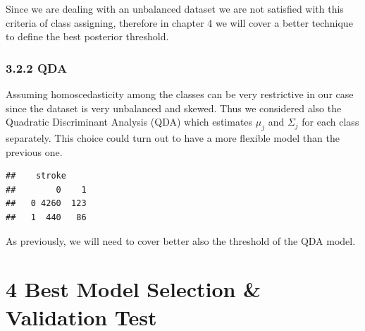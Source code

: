 \documentclass[
]{article}
\newenvironment{Shaded}{\begin{snugshade}}{\end{snugshade}}
\newcommand{\AttributeTok}[1]{\textcolor[rgb]{0.77,0.63,0.00}{#1}}
\newcommand{\DecValTok}[1]{\textcolor[rgb]{0.00,0.00,0.81}{#1}}
\newcommand{\FunctionTok}[1]{\textcolor[rgb]{0.00,0.00,0.00}{#1}}
\newcommand{\NormalTok}[1]{#1}
\newcommand{\OtherTok}[1]{\textcolor[rgb]{0.56,0.35,0.01}{#1}}
\newcommand{\SpecialCharTok}[1]{\textcolor[rgb]{0.00,0.00,0.00}{#1}}
\begin{document}
Since we are dealing with an unbalanced dataset we are not satisfied
with this criteria of class assigning, therefore in chapter 4 we will
cover a better technique to define the best posterior threshold.

\hypertarget{qda}{%
\subsubsection{3.2.2 QDA}\label{qda}}

Assuming homoscedasticity among the classes can be very restrictive in
our case since the dataset is very unbalanced and skewed. Thus we
considered also the Quadratic Discriminant Analysis (QDA) which
estimates \(\mu_j\) and \(\Sigma_j\) for each class separately. This
choice could turn out to have a more flexible model than the
previous one.

\begin{Shaded}
\end{Shaded}

\begin{verbatim}
##    stroke
##        0    1
##   0 4260  123
##   1  440   86
\end{verbatim}

As previously, we will need to cover better also the threshold of the
QDA model.

\hypertarget{best-model-selection-validation-test}{%
\section{4 Best Model Selection \& Validation
Test}\label{best-model-selection-validation-test}}
\end{document}
